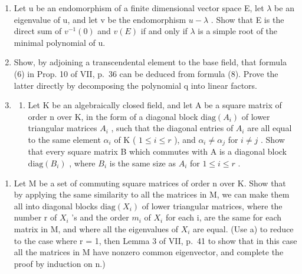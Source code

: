 \begin{enumerate}
\def\labelenumi{\arabic{enumi})}
\setcounter{enumi}{2}
\item
  Let u be an endomorphism of a finite dimensional vector space E, let \(\lambda\) be an eigenvalue of u, and let v be the endomorphism \(u - \lambda\) . Show that E is the direct sum of \(v^{-1}(0)\) and \(v(E)\) if and only if \(\lambda\) is a simple root of the minimal polynomial of u.
\item
  Show, by adjoining a transcendental element to the base field, that formula (6) in Prop. 10 of VII, p.~36 can be deduced from formula (8). Prove the latter directly by decomposing the polynomial q into linear factors.
\item
  \begin{enumerate}
  \def\labelenumii{\alph{enumii})}
  \tightlist
  \item
    Let K be an algebraically closed field, and let A be a square matrix of order n over K, in the form of a diagonal block \(\text{diag}(A_i)\) of lower triangular matrices \(A_i\) , such that the diagonal entries of \(A_i\) are all equal to the same element \(\alpha_i\) of K ( \(1 \leqslant i \leqslant r\) ), and \(\alpha_i \neq \alpha_j\) for \(i \neq j\) . Show that every square matrix B which commutes with A is a diagonal block \(\text{diag}(B_i)\) , where \(B_i\) is the same size as \(A_i\) for \(1 \leqslant i \leqslant r\) .
  \end{enumerate}
\end{enumerate}

\begin{enumerate}
\def\labelenumi{\alph{enumi})}
\setcounter{enumi}{1}
\tightlist
\item
  Let M be a set of commuting square matrices of order n over K. Show that by applying the same similarity to all the matrices in M, we can make them all into diagonal blocks \(\text{diag}(X_i)\) of lower triangular matrices, where the number r of \(X_i\) 's and the order \(m_i\) of \(X_i\) for each i, are the same for each matrix in M, and where all the eigenvalues of \(X_i\) are equal. (Use a) to reduce to the case where r = 1, then Lemma 3 of VII, p.~41 to show that in this case all the matrices in M have nonzero common eigenvector, and complete the proof by induction on n.)
\end{enumerate}


